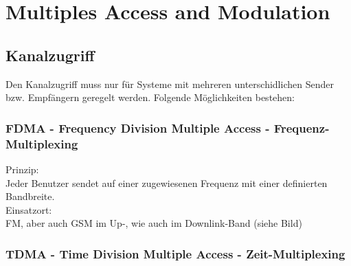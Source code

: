 \newpage
\section{Multiples Access and Modulation }
\subsection{Kanalzugriff}
	Den Kanalzugriff muss nur für Systeme mit mehreren unterschidlichen Sender bzw.
	Empfängern geregelt werden. Folgende Möglichkeiten bestehen:\\

\subsubsection{FDMA - Frequency Division Multiple Access - Frequenz-Multiplexing
} Prinzip:\\Jeder Benutzer sendet auf einer zugewiesenen Frequenz mit einer
		definierten Bandbreite.\\
		Einsatzort:\\FM, aber auch GSM im Up-, wie auch im Downlink-Band (siehe
		Bild)\\
\subsubsection{TDMA - Time Division Multiple Access - Zeit-Multiplexing
}

